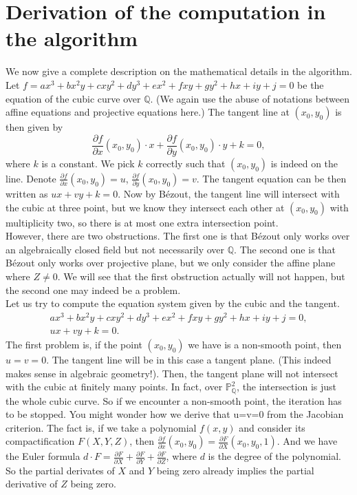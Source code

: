 \documentclass[a4paper,oneside,11pt]{article}
\newcommand{\bP}{\mathbb{P}}
\newcommand{\bQ}{\mathbb{Q}}
\theoremstyle{definition}
\begin{document}
\section{Derivation of the computation in the algorithm}
We now give a complete description on the mathematical details in the algorithm.\\
Let $f=ax^3+bx^2y+cxy^2+dy^3+ex^2+fxy+gy^2+hx+iy+j=0$ be the equation of the cubic curve over $\bQ$. (We again use the abuse of notations between affine equations and projective equations here.) The tangent line at $(x_0,y_0)$ is then given by
\[
	\frac{\partial f}{\partial x}(x_0,y_0) \cdot x + \frac{\partial f}{\partial y}(x_0,y_0) \cdot y + k = 0,
\]
where $k$ is a constant. We pick $k$ correctly such that $(x_0,y_0)$ is indeed on the line. Denote $\frac{\partial f}{\partial x}(x_0,y_0) = u$, $\frac{\partial f}{\partial y}(x_0,y_0) = v$. The tangent equation can be then written as $ux+vy+k=0$. Now by B\'ezout, the tangent line will intersect with the cubic at three point, but we know they intersect each other at $(x_0,y_0)$ with multiplicity two, so there is at most one extra intersection point.\\
However, there are two obstructions. The first one is that B\'ezout only works over an algebraically closed field but not necessarily over $\bQ$. The second one is that B\'ezout only works over projective plane, but we only consider the affine plane where $Z\neq 0$. We will see that the first obstruction actually will not happen, but the second one may indeed be a problem.\\
Let us try to compute the equation system given by the cubic and the tangent.
\begin{align*}
	ax^3+bx^2y+cxy^2+dy^3+ex^2+fxy+gy^2+hx+iy+j=0,\\
	ux+vy+k=0.
\end{align*}
The first problem is, if the point $(x_0,y_0)$ we have is a non-smooth point, then $u=v=0$. The tangent line will be in this case a tangent plane. (This indeed makes sense in algebraic geometry!). Then, the tangent plane will not intersect with the cubic at finitely many points. In fact, over $\bP^2_\bQ$, the intersection is just the whole cubic curve. So if we encounter a non-smooth point, the iteration has to be stopped.
You might wonder how we derive that u=v=0 from the Jacobian criterion. The fact is, if we take a polynomial $f(x,y)$ and consider its compactification $F(X,Y,Z)$, then $\frac{\partial f}{\partial x}(x_0,y_0)=\frac{\partial F}{\partial X}(x_0,y_0,1)$. And we have the Euler formula $d\cdot F=\frac{\partial F}{\partial X}+\frac{\partial F}{\partial Y}+\frac{\partial F}{\partial Z}$, where $d$ is the degree of the polynomial. So the partial derivates of $X$ and $Y$ being zero already implies the partial derivative of $Z$ being zero.\\
\end{document}
